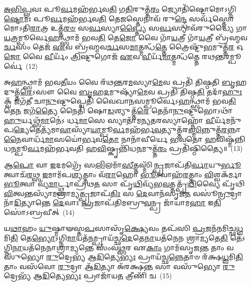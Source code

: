 \-\ul{𑌅}\-\-\ul{𑌭𑌿}\-\-\ul{𑌪𑍍𑌲}\-𑌵𑌃 𑌪𑍂\-\ul{𑌰𑍍𑌵}\-𑌮𑌹᳴𑌰𑍍𑌭𑌵\-\ul{𑌤𑌿} 𑌗\-\ul{𑌤𑌿}\-𑌰𑍁𑌤𑍍𑌤᳴\-\ul{𑌰𑌂} 𑌜𑍍𑌯𑍋𑌤𑌿᳴𑌷𑍍𑌟𑍋𑌮𑍋\-𑌽𑌗𑍍𑌨𑌿\-\ul{𑌷𑍍𑌟𑍋}\-𑌮𑌃 𑌪𑍂\-\ul{𑌰𑍍𑌵}\-𑌮𑌹᳴𑌰𑍍𑌭𑌵\-\ul{𑌤𑌿} 𑌤𑍇\-\ul{𑌜}\-𑌸𑍍𑌤𑍇𑌨𑌾𑌵᳴ 𑌰𑍁\-\ul{𑌨𑍍𑌦𑍍𑌧𑍇} 𑌸𑌰𑍍𑌵᳴𑌸𑍍𑌤𑍋𑌮𑍋\-𑌽𑌤𑌿\-\ul{𑌰𑌾}\-𑌤𑍍𑌰 𑌉𑌤𑍍𑌤᳴\-\ul{𑌰}\-\-\ul{𑍞} 𑌸\-\ul{𑌰𑍍𑌵}\-𑌸𑍍𑌯𑌾\-\ul{𑌪𑍍𑌤𑍍𑌯𑍈} 𑌸\-\ul{𑌰𑍍𑌵}\-𑌸𑍍𑌯𑌾𑌵᳴𑌰𑍁𑌦𑍍𑌧𑍍𑌯𑍈 𑌗𑌾\-\ul{𑌯}\-𑌤𑍍𑌰𑌮𑍍𑌪𑍂𑌰𑍍𑌵𑍇\-\ul{𑌹}\-𑌨𑍍𑌥𑍍𑌸𑌾𑌮᳴ 𑌭𑌵\-\ul{𑌤𑌿} 𑌤𑍇\-\ul{𑌜𑍋} 𑌵𑍈 𑌗𑌾᳴\-\ul{𑌯}\-𑌤𑍍𑌰𑍀 𑌗𑌾᳴\-\ul{𑌯}\-𑌤𑍍𑌰𑍀 𑌬𑍍𑌰᳴𑌹𑍍𑌮𑌵\-\ul{𑌰𑍍𑌚}\-𑌸𑌂 𑌤𑍇𑌜᳴ \ul{𑌏}\-𑌵 𑌬𑍍𑌰᳴𑌹𑍍𑌮𑌵\-\ul{𑌰𑍍𑌚}\-𑌸\-\-\ul{𑌮𑌾}\-𑌤𑍍𑌮𑌨𑍍𑌧᳴\-\ul{𑌤𑍍𑌤𑍇} 𑌤𑍍𑌰𑍈𑌷𑍍𑌟𑍁᳴\-\ul{𑌭}\-𑌮𑍁𑌤𑍍𑌤᳴\-\ul{𑌰} 𑌓\-\ul{𑌜𑍋} 𑌵𑍈 \ul{𑌵𑍀}\-𑌰𑍍𑌯𑌂᳴ \ul{𑌤𑍍𑌰𑌿}\-𑌷𑍍𑌟𑍁𑌗𑍋𑌜᳴ \ul{𑌏}\-𑌵 \ul{𑌵𑍀}\-𑌰𑍍𑌯᳴\-\ul{𑌮𑌾}\-𑌤𑍍𑌮𑌨𑍍𑌧᳴𑌤𑍍𑌤𑍇 𑌰𑌥\-\ul{𑌨𑍍𑌤}\-𑌰𑌮𑍍𑌪𑍂𑌰𑍍𑌵𑍇॑~(12)

𑌅\-\ul{𑌹}\-𑌨𑍍𑌥𑍍𑌸𑌾𑌮᳴ 𑌭𑌵\-\ul{𑌤𑍀}\-𑌯𑌂 𑌵𑍈 𑌰᳴𑌥\-\ul{𑌨𑍍𑌤}\-𑌰\-\ul{𑌮}\-𑌸𑍍𑌯𑌾\-\ul{𑌮𑍇}\-𑌵 𑌪𑍍𑌰𑌤𑌿᳴ 𑌤𑌿𑌷𑍍𑌠𑌤𑌿 \ul{𑌬𑍃}\-𑌹𑌦𑍁𑌤𑍍𑌤᳴\-\ul{𑌰𑍇}\-\-𑌽𑌸𑍗 𑌵𑍈 \ul{𑌬𑍃}\-𑌹\-\ul{𑌦}\-𑌮𑍁𑌷𑍍𑌯𑌾᳴\-\ul{𑌮𑍇}\-𑌵 𑌪𑍍𑌰𑌤𑌿᳴ 𑌤𑌿𑌷𑍍𑌠\-\ul{𑌤𑌿} 𑌤𑌦𑌾᳴\-\ul{𑌹𑍁𑌃} 𑌕𑍍𑌵᳴ 𑌜𑌗᳴𑌤𑍀 𑌚𑌾\-\ul{𑌨𑍁}\-𑌷𑍍𑌟𑍁𑌪𑍍𑌚𑍇𑌤𑌿᳴ 𑌵𑍈𑌖𑌾\-\ul{𑌨}\-𑌸𑌮𑍍𑌪𑍂𑌰𑍍𑌵𑍇\-𑌽\-\ul{𑌹}\-𑌨𑍍𑌥𑍍𑌸𑌾𑌮᳴ 𑌭𑌵\-\ul{𑌤𑌿} 𑌤𑍇\-\ul{𑌨} 𑌜𑌗᳴\-\ul{𑌤𑍍𑌯𑍈} 𑌨𑍈𑌤𑌿᳴ 𑌷𑍋\-\ul{𑌡}\-𑌶𑍍𑌯𑍁𑌤𑍍𑌤᳴\-\ul{𑌰𑍇} 𑌤𑍇𑌨𑌾᳴\-\ul{𑌨𑍁}\-𑌷𑍍𑌟𑍁𑌭𑍋\-𑌽𑌥𑌾᳴\-\ul{𑌹𑍁}\-𑌰𑍍𑌯𑌥𑍍𑌸᳴\-\ul{𑌮𑌾}\-𑌨𑍇॑\-𑌽 𑌰𑍍𑌧\-\ul{𑌮𑌾}\-𑌸𑍇 𑌸𑍍𑌯𑌾𑌤𑌾᳴𑌮𑌨𑍍𑌯\-\ul{𑌤}\-𑌰𑌸𑍍𑌯𑌾𑌹𑍍𑌨𑍋᳴ \ul{𑌵𑍀}\-𑌰𑍍𑌯᳴𑌮𑌨𑍁᳴ 𑌪\-\ul{𑌦𑍍𑌯𑍇}\-𑌤𑍇𑌤𑍍𑌯᳴𑌮𑌾\-\ul{𑌵𑌾}\-𑌸𑍍𑌯𑌾᳴\-\ul{𑌯𑌾}\-𑌮𑍍𑌪𑍂\-\ul{𑌰𑍍𑌵}\-𑌮𑌹᳴𑌰𑍍𑌭\-\ul{𑌵}\-𑌤𑍍𑌯𑍁𑌤𑍍𑌤᳴𑌰\-\ul{𑌸𑍍𑌮𑌿}\-𑌨𑍍𑌨𑍁𑌤𑍍𑌤᳴\-\ul{𑌰}\-𑌨𑍍𑌨𑌾\-\ul{𑌨𑍈}\-𑌵𑌾𑌰𑍍𑌧᳴\-\ul{𑌮𑌾}\-𑌸𑌯𑍋॑𑌰𑍍𑌭𑌵\-\ul{𑌤𑍋} 𑌨𑌾𑌨𑌾᳴𑌵𑍀𑌰𑍍𑌯𑍇 𑌭𑌵𑌤𑍋 \ul{𑌹}\-𑌵𑌿𑌷𑍍𑌮᳴𑌨𑍍𑌨𑌿𑌧\-\ul{𑌨}\-𑌮𑍍𑌪𑍂\-\ul{𑌰𑍍𑌵}\-𑌮𑌹᳴𑌰𑍍𑌭𑌵𑌤𑌿 𑌹\-\ul{𑌵𑌿}\-𑌷𑍍𑌕𑍃𑌨𑍍𑌨𑌿᳴𑌧\-\ul{𑌨}\-𑌮𑍁𑌤𑍍𑌤᳴\-\ul{𑌰𑌂} 𑌪𑍍𑌰𑌤𑌿᳴𑌷𑍍𑌠𑌿𑌤𑍍𑌯𑍈॥~(13)

{\anuvakamend[{𑌉𑌤𑍍𑌤᳴𑌰𑍇𑌣 𑌰𑌥\-\ul{𑌨𑍍𑌤}\-𑌰𑌮𑍍𑌪𑍂𑌰𑍍𑌵𑍇\-𑌽𑌨𑍍𑌵𑍇𑌕᳴𑌵𑌿𑍞𑌶𑌤𑌿𑌶𑍍𑌚}]}%

𑌆\-\ul{𑌪𑍋} 𑌵𑌾 \ul{𑌇}\-𑌦𑌮𑌗𑍍𑌰𑍇᳴ 𑌸\-\ul{𑌲𑌿}\-𑌲𑌮𑌾᳴\-\ul{𑌸𑍀}\-𑌤𑍍𑌤𑌸𑍍𑌮𑌿᳴\-\ul{𑌨𑍍𑌪𑍍𑌰}\-𑌜𑌾𑌪᳴𑌤𑌿\-\ul{𑌰𑍍𑌵𑌾}\-𑌯𑍁\-\ul{𑌰𑍍𑌭𑍂}\-𑌤𑍍𑌵𑌾𑌚᳴\-\ul{𑌰}\-𑌥𑍍𑌸 \ul{𑌇}\-𑌮𑌾𑌮᳴𑌪\-\ul{𑌶𑍍𑌯}\-𑌤𑍍𑌤𑌾𑌂 𑌵᳴\-\ul{𑌰𑌾}\-𑌹𑍋 \ul{𑌭𑍂}\-𑌤𑍍𑌵𑌾𑌹᳴\-\ul{𑌰}\-𑌤𑍍𑌤𑌾𑌂 \ul{𑌵𑌿}\-𑌶𑍍𑌵𑌕᳴𑌰𑍍𑌮𑌾 \ul{𑌭𑍂}\-𑌤𑍍𑌵𑌾 𑌵𑍍𑌯᳴\-\ul{𑌮𑌾}\-𑌰𑍍𑌟𑍍𑌥𑍍𑌸𑌾𑌪𑍍𑌰᳴𑌥\-\ul{𑌤} 𑌸𑌾 𑌪𑍃᳴\-\ul{𑌥𑌿}\-𑌵𑍍𑌯᳴𑌭\-\ul{𑌵}\-𑌤𑍍𑌤𑌤𑍍𑌪𑍃᳴\-\ul{𑌥𑌿}\-𑌵𑍍𑌯𑍈 𑌪𑍃᳴𑌥𑌿\-\ul{𑌵𑌿}\-𑌤𑍍𑌵𑌨𑍍𑌤𑌸𑍍𑌯𑌾᳴𑌮𑌶𑍍𑌰𑌾𑌮𑍍𑌯\-\ul{𑌤𑍍𑌪𑍍𑌰}\-𑌜𑌾𑌪᳴\-\ul{𑌤𑌿𑌃} 𑌸 \ul{𑌦𑍇}\-𑌵𑌾𑌨᳴𑌸𑍃𑌜\-\ul{𑌤} 𑌵𑌸𑍂॑\-\ul{𑌨𑍍𑌰𑍁}\-𑌦𑍍𑌰𑌾𑌨𑌾᳴\-\ul{𑌦𑌿}\-𑌤𑍍𑌯𑌾𑌨𑍍𑌤𑍇 \ul{𑌦𑍇}\-𑌵𑌾𑌃 \ul{𑌪𑍍𑌰}\-𑌜𑌾𑌪᳴𑌤𑌿𑌮𑌬𑍍𑌰𑍁\-\ul{𑌵}\-𑌨𑍍𑌪𑍍𑌰 𑌜𑌾᳴𑌯𑌾𑌮\-\ul{𑌹𑌾} 𑌇\-\ul{𑌤𑌿} 𑌸𑍋॑\-𑌽𑌬𑍍𑌰𑌵𑍀𑌤𑍍~(14)

𑌯\-\ul{𑌥𑌾}\-𑌹𑌂 \ul{𑌯𑍁}\-𑌷𑍍𑌮𑌾𑍟𑌸𑍍𑌤\-\ul{𑌪}\-𑌸𑌾𑌸𑍃᳴\-\ul{𑌕𑍍𑌷𑍍𑌯𑍇}\-𑌵𑌂 𑌤𑌪᳴𑌸𑌿 \ul{𑌪𑍍𑌰}\-𑌜𑌨᳴𑌨𑌮𑌿𑌚𑍍𑌛\-\ul{𑌧𑍍𑌵}\-𑌮𑌿\-\ul{𑌤𑌿} 𑌤𑍇\-\ul{𑌭𑍍𑌯𑍋}\-\-𑌽𑌗𑍍𑌨𑌿\-\ul{𑌮𑌾}\-𑌯𑌤᳴\-\ul{𑌨}\-𑌮𑍍𑌪𑍍𑌰𑌾𑌯᳴𑌚𑍍𑌛\-\ul{𑌦𑍇}\-𑌤𑍇\-\ul{𑌨𑌾}\-𑌯𑌤᳴𑌨𑍇𑌨 𑌶𑍍𑌰𑌾\-\ul{𑌮𑍍𑌯}\-𑌤𑍇\-\ul{𑌤𑌿} 𑌤𑍇॑\-𑌽𑌗𑍍𑌨𑌿\-\ul{𑌨𑌾}\-𑌯𑌤᳴𑌨𑍇𑌨𑌾𑌶𑍍𑌰𑌾\-\ul{𑌮𑍍𑌯}\-𑌨𑍍𑌤𑍇 𑌸𑌂᳴𑌵\-\ul{𑌥𑍍𑌸}\-𑌰 𑌏\-\ul{𑌕𑌾𑌂} 𑌗𑌾𑌮᳴𑌸𑍃𑌜\-\ul{𑌨𑍍𑌤} 𑌤𑌾𑌂 𑌵𑌸𑍁᳴𑌭𑍍𑌯𑍋 \ul{𑌰𑍁}\-𑌦𑍍𑌰𑍇𑌭𑍍𑌯᳴ 𑌆\-\ul{𑌦𑌿}\-𑌤𑍍𑌯𑍇\-\ul{𑌭𑍍𑌯𑌃} 𑌪𑍍𑌰𑌾𑌯᳴𑌚𑍍𑌛\-\ul{𑌨𑍍𑌨𑍇}\-𑌤𑌾𑍞 𑌰᳴𑌕𑍍𑌷\-\ul{𑌧𑍍𑌵}\-𑌮𑌿\-\ul{𑌤𑌿} 𑌤𑌾𑌂 𑌵𑌸᳴𑌵𑍋 \ul{𑌰𑍁}\-𑌦𑍍𑌰𑌾 𑌆᳴\-\ul{𑌦𑌿}\-𑌤𑍍𑌯𑌾 𑌅᳴𑌰𑌕𑍍𑌷\-\ul{𑌨𑍍𑌤} 𑌸𑌾 𑌵𑌸𑍁᳴𑌭𑍍𑌯𑍋 \ul{𑌰𑍁}\-𑌦𑍍𑌰𑍇𑌭𑍍𑌯᳴ 𑌆\-\ul{𑌦𑌿}\-𑌤𑍍𑌯𑍇\-\ul{𑌭𑍍𑌯𑌃} 𑌪𑍍𑌰𑌾𑌜𑌾᳴𑌯\-\ul{𑌤} 𑌤𑍍𑌰𑍀𑌣𑌿᳴ 𑌚~(15)

